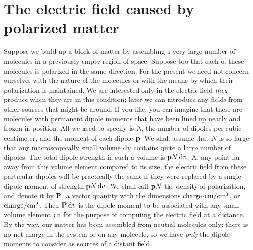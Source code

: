 \section{The electric field caused by polarized matter}

Suppose we build up a block of matter by assembling a very large
number of molecules in a previously empty region of space. Suppose
too that each of these molecules is polarized in the same direction.
For the present we need not concern ourselves with the nature of the
molecules or with the means by which their polarization is 
maintained. We are interested only in the electric field \emph{they} produce when
they are in this condition; later we can introduce any fields from other
sources that might be around. If you like, you can imagine that these
are molecules with permanent dipole moments that have been lined
up neatly and frozen in position. All we need to specify is $N$, the
number of dipoles per cubic centimeter, and the moment of each
dipole $\mathbf{p}$. We shall assume that $N$ is so large that any macroscopically
small volume $\operatorname{d\!} v$ contains quite a large number of dipoles. The total
dipole strength in such a volume is $\mathbf{p}N\operatorname{d\!} v$. At any point far away
from this volume element compared to its size, the electric field from
these particular dipoles will be practically the same if they were replaced
by a single dipole moment of strength $\mathbf{p}N\operatorname{d\!} v$. We shall call $\mathbf{p}N$
the density of polarization, and denote it by $\mathbf{P}$, a vector quantity with
the dimensions $\textup{charge}\!\cdot\!\textup{cm}/\textup{cm}^3$, or 
$\textup{charge}/\textup{cm}^2$. Then $\mathbf{P}\operatorname{d\!} v$ is the
dipole moment to be associated with any small volume element $\operatorname{d\!} v$
for the purpose of computing the electric field at a distance. By the
way, our matter has been assembled from neutral molecules only;
there is no net charge in the system or on any molecule, so we have
\emph{only} the dipole moments to consider as sources of a distant field.

